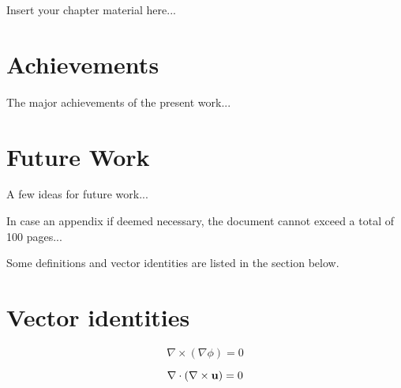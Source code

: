 \fi

Insert your chapter material here...


\section{Achievements}
\label{section:achievements}

The major achievements of the present work...


\section{Future Work}
\label{section:future}

A few ideas for future work...


In case an appendix if deemed necessary, the document cannot exceed a total of 100 pages...

Some definitions and vector identities are listed in the section below.
\section{Vector identities}
\label{section:vectorIdentities}

\begin{equation}
	\nabla \times \left( \nabla \phi \right) = 0
	\label{eq:cross_nnp}
\end{equation}

\begin{equation}
	\nabla \cdot \left( \nabla \times {\bf u} \right) = 0
	\label{eq:dotCross_nnu}
\end{equation}
